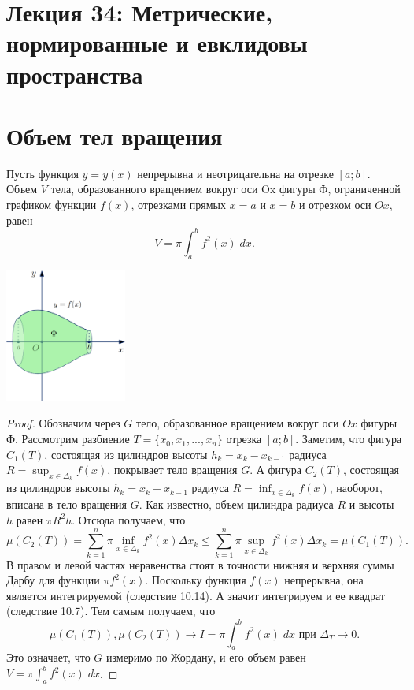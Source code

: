     \section*{Лекция 34: Метрические, нормированные и евклидовы  пространства}
    
    \section{Объем тел вращения}
    
    \begin{theorem}
    	Пусть функция $y = y(x)$ непрерывна и неотрицательна на отрезке $[a; b]$. Объем $V$ тела, образованного вращением вокруг оси Ox фигуры Ф, ограниченной графиком функции $f(x)$, отрезками прямых $x = a$ и $x = b$ и отрезком оси $Ox$, равен
    	\[ V = \pi \int_a^b f^2(x) \; dx. \]
    \end{theorem}
    
    \begin{center}
    	\includegraphics[width=0.3\textwidth]{img/lecture33/the_area_of_the_figure4}
    \end{center}
    
    \begin{proof}
    	Обозначим через $G$ тело, образованное вращением вокруг оси $Ox$ фигуры Ф. Рассмотрим разбиение $T = \{x_0, x_1, ..., x_n\}$ отрезка $[a; b]$. Заметим, что фигура $C_1(T)$, состоящая из цилиндров высоты $h_k = x_k - x_{k - 1}$ радиуса $R = \sup_{x \in \Delta_k} f(x)$, покрывает тело вращения $G$. А фигура $C_2(T)$, состоящая из цилиндров высоты $h_k = x_k - x_{k - 1}$ радиуса $R = \inf_{x \in \Delta_k} f(x)$, наоборот, вписана в тело вращения $G$. Как известно, объем цилиндра радиуса $R$ и высоты $h$ равен $\pi R^2 h$. Отсюда получаем, что
    	\[ \mu(C_2(T)) = \sum_{k = 1}^n \pi \inf_{x \in \Delta_k} f^2(x) \Delta x_k \leqslant \sum_{k = 1}^n \pi \sup_{x \in \Delta_k} f^2(x) \Delta x_k = \mu(C_1(T)). \]
    	В правом и левой частях неравенства стоят в точности нижняя и верхняя суммы Дарбу для функции $\pi f^2(x)$. Поскольку функция $f(x)$ непрерывна, она является интегрируемой (следствие 10.14). А значит интегрируем и ее квадрат (следствие 10.7). Тем самым получаем, что
    	\[ \mu(C_1(T)), \mu(C_2(T)) \to I = \pi \int_a^b f^2(x) \; dx \text{ при } \Delta_T \to 0. \]
    	Это означает, что $G$ измеримо по Жордану, и его объем равен $V = \pi \int_a^b f^2(x) \; dx$.
    \end{proof}
    
